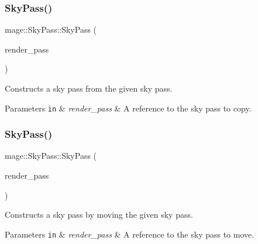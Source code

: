 \subsubsection{\texorpdfstring{Sky\+Pass()}{SkyPass()}\hspace{0.1cm}{\footnotesize\ttfamily [2/3]}}
{\footnotesize\ttfamily mage\+::\+Sky\+Pass\+::\+Sky\+Pass (\begin{DoxyParamCaption}\item[{const \hyperlink{classmage_1_1_sky_pass}{Sky\+Pass} \&}]{render\+\_\+pass }\end{DoxyParamCaption})\hspace{0.3cm}{\ttfamily [delete]}}

Constructs a sky pass from the given sky pass.


\begin{DoxyParams}[1]{Parameters}
\mbox{\tt in}  & {\em render\+\_\+pass} & A reference to the sky pass to copy. \\
\hline
\end{DoxyParams}
\hypertarget{classmage_1_1_sky_pass_a6bd646c3f01beb171a19efe72b6cdbab}{}\label{classmage_1_1_sky_pass_a6bd646c3f01beb171a19efe72b6cdbab} 
\subsubsection{\texorpdfstring{Sky\+Pass()}{SkyPass()}\hspace{0.1cm}{\footnotesize\ttfamily [3/3]}}
{\footnotesize\ttfamily mage\+::\+Sky\+Pass\+::\+Sky\+Pass (\begin{DoxyParamCaption}\item[{\hyperlink{classmage_1_1_sky_pass}{Sky\+Pass} \&\&}]{render\+\_\+pass }\end{DoxyParamCaption})\hspace{0.3cm}{\ttfamily [default]}}

Constructs a sky pass by moving the given sky pass.


\begin{DoxyParams}[1]{Parameters}
\mbox{\tt in}  & {\em render\+\_\+pass} & A reference to the sky pass to move. \\
\hline
\end{DoxyParams}
\hypertarget{classmage_1_1_sky_pass_ab3e581e2eedfc62e13c71d91359f71ce}{}\label{classmage_1_1_sky_pass_ab3e581e2eedfc62e13c71d91359f71ce} 

